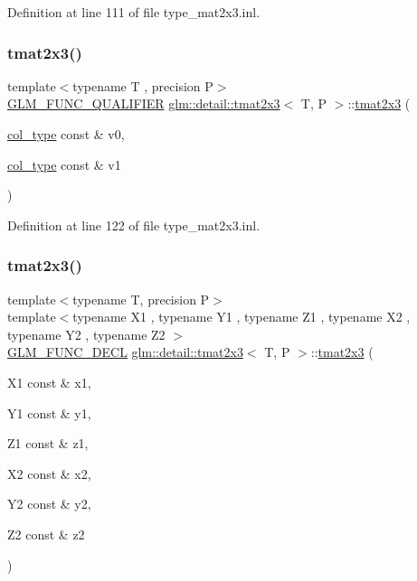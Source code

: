 Definition at line 111 of file type\+\_\+mat2x3.\+inl.

\mbox{\label{structglm_1_1detail_1_1tmat2x3_ad26d0797d1a4ef0117dfd412dde991ea}} 
\subsubsection{\texorpdfstring{tmat2x3()}{tmat2x3()}\hspace{0.1cm}{\footnotesize\ttfamily [7/22]}}
{\footnotesize\ttfamily template$<$typename T , precision P$>$ \\
\hyperlink{setup_8hpp_a33fdea6f91c5f834105f7415e2a64407}{G\+L\+M\+\_\+\+F\+U\+N\+C\+\_\+\+Q\+U\+A\+L\+I\+F\+I\+ER} \hyperlink{structglm_1_1detail_1_1tmat2x3}{glm\+::detail\+::tmat2x3}$<$ T, P $>$\+::\hyperlink{structglm_1_1detail_1_1tmat2x3}{tmat2x3} (\begin{DoxyParamCaption}\item[{\hyperlink{structglm_1_1detail_1_1tmat2x3_aa68634b0c048f0010844a45aa5e9bdab}{col\+\_\+type} const \&}]{v0,  }\item[{\hyperlink{structglm_1_1detail_1_1tmat2x3_aa68634b0c048f0010844a45aa5e9bdab}{col\+\_\+type} const \&}]{v1 }\end{DoxyParamCaption})}



Definition at line 122 of file type\+\_\+mat2x3.\+inl.

\mbox{\label{structglm_1_1detail_1_1tmat2x3_ac112d37bc3331b1735c1aeb591483bc0}} 
\subsubsection{\texorpdfstring{tmat2x3()}{tmat2x3()}\hspace{0.1cm}{\footnotesize\ttfamily [8/22]}}
{\footnotesize\ttfamily template$<$typename T, precision P$>$ \\
template$<$typename X1 , typename Y1 , typename Z1 , typename X2 , typename Y2 , typename Z2 $>$ \\
\hyperlink{setup_8hpp_ab2d052de21a70539923e9bcbf6e83a51}{G\+L\+M\+\_\+\+F\+U\+N\+C\+\_\+\+D\+E\+CL} \hyperlink{structglm_1_1detail_1_1tmat2x3}{glm\+::detail\+::tmat2x3}$<$ T, P $>$\+::\hyperlink{structglm_1_1detail_1_1tmat2x3}{tmat2x3} (\begin{DoxyParamCaption}\item[{X1 const \&}]{x1,  }\item[{Y1 const \&}]{y1,  }\item[{Z1 const \&}]{z1,  }\item[{X2 const \&}]{x2,  }\item[{Y2 const \&}]{y2,  }\item[{Z2 const \&}]{z2 }\end{DoxyParamCaption})}

